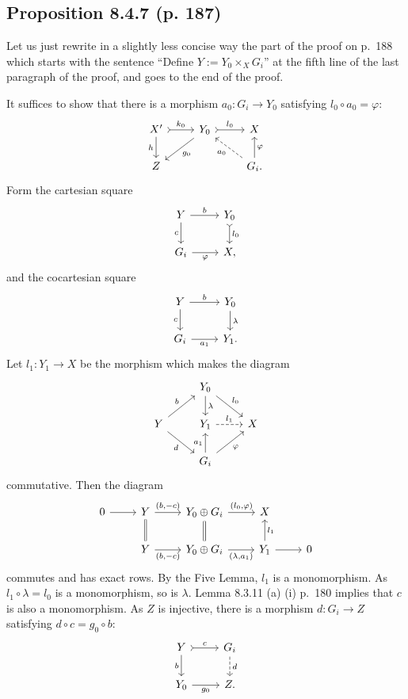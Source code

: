 \documentclass[12pt]{article}%
\theoremstyle{remark}
\theoremstyle{definition}
\newcommand{\pp}{\varphi}
\begin{document}

\subsection{Proposition 8.4.7 (p. 187)}

Let us just rewrite in a slightly less concise way the part of the proof on p.~188 which starts with the sentence ``Define $Y:=Y_0\times_XG_i$'' at the fifth line of the last paragraph of the proof, and goes to the end of the proof. 

It suffices to show that there is a morphism $a_0:G_i\to Y_0$ satisfying $l_0\circ a_0=\varphi$:
$$
\begin{tikzcd}
X'\ar{d}[swap]{h}\ar[tail]{r}{k_0}&Y_0\ar{dl}{g_0}\ar[tail]{r}{l_0}&X\\ 
Z&&G_i.\ar[dashed]{ul}{a_0}\ar{u}[swap]{\varphi}
\end{tikzcd}
$$ 
Form the cartesian square 
$$
\begin{tikzcd}
Y\ar{r}{b}\ar[swap]{d}{c}&Y_0\ar[tail]{d}{l_0}\\
G_i\ar[swap]{r}{\varphi}&X,
\end{tikzcd}
$$
and the cocartesian square 
$$
\begin{tikzcd}
Y\ar{r}{b}\ar[swap]{d}{c}&Y_0\ar{d}{\lambda}\\
G_i\ar[swap]{r}{a_1}&Y_1.
\end{tikzcd}
$$ 
Let $l_1:Y_1\to X$ be the morphism which makes the diagram 
$$
\begin{tikzcd}
{}&Y_0\ar{d}{\lambda}\ar{dr}{l_0}\\ 
Y\ar{ur}{b}\ar{dr}[swap]{d}&Y_1\ar[dashed]{r}{l_1}&X\\ 
{}&G_i\ar{u}{a_1}\ar{ru}[swap]{\pp}
\end{tikzcd}
$$ 
commutative. Then the diagram 
$$
\begin{tikzcd}
0\ar{r}&Y\ar[equal]{d}\ar{r}{(b,-c)}&Y_0\oplus G_i\ar[equal]{d}\ar{r}{(l_0,\varphi)}&X\\
&Y\ar{r}[swap]{(b,-c)}&Y_0\oplus G_i\ar{r}[swap]{(\lambda,a_1)}&Y_1\ar{r}\ar{u}[swap]{l_1}&0
\end{tikzcd}
$$ 
commutes and has exact rows. By the Five Lemma, $l_1$ is a monomorphism. As $l_1\circ\lambda=l_0$ is a monomorphism, so is $\lambda$. Lemma 8.3.11 (a) (i) p.~180 implies that $c$ is also a monomorphism. As $Z$ is injective, there is a morphism $d:G_i\to Z$ satisfying $d\circ c=g_0\circ b$:
$$
\begin{tikzcd}
Y\ar{d}[swap]{b}\ar[tail]{r}{c}&G_i\ar[dashed]{d}{d}\\ 
Y_0\ar{r}[swap]{g_0}&Z.
\end{tikzcd}
$$ 
\end{document}
